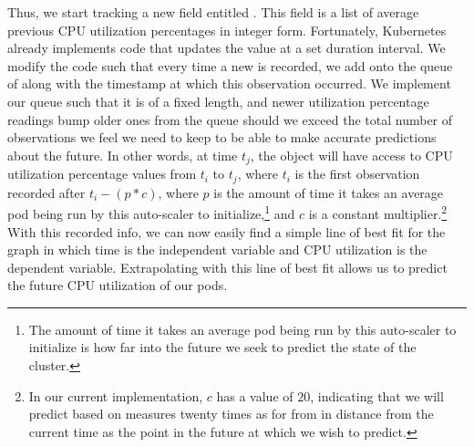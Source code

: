 Thus, we start tracking a new field entitled
. This field is a list of average previous CPU
utilization percentages in integer form. Fortunately, Kubernetes already
implements code that updates the  value
at a set duration interval. We modify the code such that every time a new
 is recorded, we add onto the queue of
 along with the timestamp at which
this observation occurred. We implement our queue such that it
is of a fixed length, and newer utilization percentage readings bump older ones
from the queue should we exceed the total number of observations we feel we need
to keep to be able to make accurate predictions about the future. In other words, at time
$t_{j}$, the  object will have access to
CPU utilization percentage values from $t_{i}$ to $t_{j}$, where $t_{i}$ is the
first observation recorded after $t_{i} - (p * c)$, where $p$ is the
amount of time it takes an
average pod being run by this auto-scaler to initialize,\footnote{The
amount of time it takes an
average pod being run by this auto-scaler to initialize is how far into the
future we seek to predict the state of the cluster.} and $c$ is a constant
multiplier.\footnote{In our current implementation, $c$ has a value of
$20$, indicating that we will predict based on measures twenty times as for from
in distance from the current time as the point in
the future at which we wish to predict.} With this recorded info,
we can now easily find a simple line of best fit
for the graph in which time is the independent variable and CPU utilization is
the dependent variable. Extrapolating with this line of best fit allows us to
predict the future CPU utilization of our pods.
